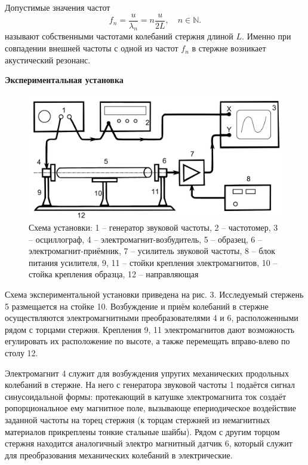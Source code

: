 \documentclass[a4paper,12 pt]{article}
\begin{document}
Допустимые значения частот
\begin{equation}
    f_n = \frac{u}{\lambda_n} = n \frac{u}{2L}, \quad n \in \mathbb{N}.
\end{equation}
называют собственными частотами колебаний стержня длиной $L$.
Именно при совпадении внешней частоты с одной из частот $f_n$ в стержне
возникает акустический резонанс.

\textbf{Экспериментальная установка}
\begin{figure}[H]
    \centering
    \includegraphics[scale = 0.3]{установка.png}
    \caption{Схема установки: 1 -- генератор звуковой частоты, 2 -- частотомер,
3 – осциллограф, 4 -- электромагнит-возбудитель, 5 -- образец, 6 -- электромагнит-приёмник, 7 -- усилитель звуковой частоты, 8 -- блок питания усилителя, 9, 11 -- стойки крепления электромагнитов, 10 -- стойка крепления образца, 12 -- направляющая}
\end{figure}

Схема экспериментальной установки приведена на рис. 3. Исследуемый стержень 5 размещается на стойке 10. Возбуждение и приём колебаний в стержне осуществляются электромагнитными преобразователями 4 и 6, расположенными рядом с торцами стержня. Крепления 9, 11 электромагнитов дают возможность егулировать их расположение по высоте, а также перемещать вправо-влево по столу 12.

Электромагнит 4 служит для возбуждения упругих механических продольных колебаний в стержне. На него с генератора звуковой частоты 1 подаётся сигнал синусоидальной формы: протекающий в катушке электромагнита ток создаёт ропорциональное ему магнитное поле, вызывающе епериодическое воздействие заданной частоты на торец стержня (к торцам стержней из немагнитных материалов прикреплены тонкие стальные шайбы). Рядом с другим торцом стержня находится аналогичный электро магнитный датчик 6, который служит для преобразования механических колебаний в электрические. 
\end{document}

